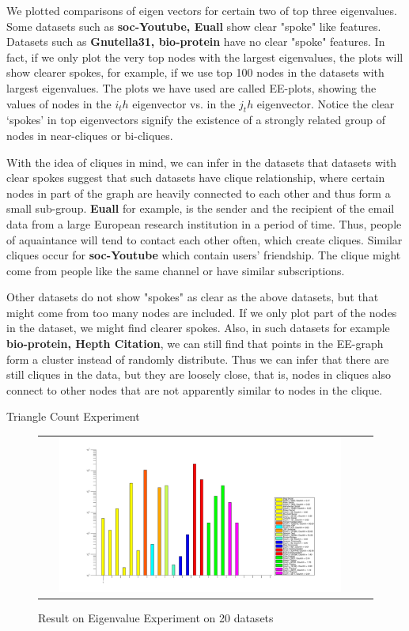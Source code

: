 We plotted comparisons of eigen vectors for certain two of top three eigenvalues. Some datasets such as \textbf{soc-Youtube, Euall} show clear "spoke" like features. Datasets such as \textbf{Gnutella31, bio-protein} have no clear "spoke" features. In fact, if we only plot the very top nodes with the largest eigenvalues, the plots will show clearer spokes, for example, if we use top 100 nodes in the datasets with largest eigenvalues. The plots we have used are called EE-plots, showing the values of nodes in the $i_th$ eigenvector vs. in the $j_th$ eigenvector. Notice the clear ‘spokes’ in top eigenvectors signify the existence of a strongly related group of nodes in near-cliques or bi-cliques. 

With the idea of cliques in mind, we can infer in the datasets that datasets with clear spokes suggest that such datasets have clique relationship, where certain nodes in part of the graph are heavily connected to each other and thus form a small sub-group. \textbf{Euall} for example, is the sender and the recipient of the email data from a large European research institution in a period of time. Thus, people of aquaintance will tend to contact each other often, which create cliques.
Similar cliques occur for \textbf{soc-Youtube} which contain users' friendship. The clique might come from people like the same channel or have similar subscriptions.

Other datasets do not show "spokes" as clear as the above datasets, but that might come from too many nodes are included. If we only plot part of the nodes in the dataset, we might find clearer spokes. Also, in such datasets for example \textbf{bio-protein, Hepth Citation}, we can still find that points in the EE-graph form a cluster instead of randomly distribute. Thus we can infer that there are still cliques in the data, but they are loosely close, that is, nodes in cliques also connect to other nodes that are not apparently similar to nodes in the clique.

Triangle Count Experiment

\begin{figure}[H]
\begin{center}
\begin{tabular}{cc}
     \includegraphics[width=0.9\textwidth]{FIG/trianglecount.png}
\end{tabular}
\caption{Result on Eigenvalue Experiment on 20 datasets}
\end{center}
\end{figure}

